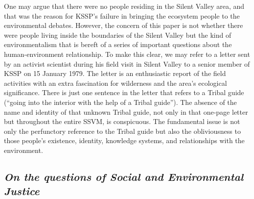 \documentclass[twoside, 13pt]{article}
\begin{document}
{{{{One may argue that there were no people residing in the Silent Valley area, and that was the reason for KSSP’s failure in bringing the ecosystem people to the environmental debates. However, the concern of this paper is not whether there were people living inside the boundaries of the Silent Valley but the kind of environmentalism that is bereft of a series of important questions about the human-environment relationship. To make this clear, we may refer to a letter sent by an activist scientist during his field visit in Silent Valley to a senior member of KSSP on 15 January 1979. The letter is an enthusiastic report of the field activities with an extra fascination for wilderness and the area’s ecological significance. There is just one sentence in the letter that refers to a Tribal guide (“going into the interior with the help of a Tribal guide”). The absence of the name and identity of that unknown Tribal guide, not only in that one-page letter but throughout the entire SSVM, is conspicuous. The fundamental issue is not only the perfunctory reference to the Tribal guide but also the obliviousness to those people’s existence, identity, knowledge systems, and relationships with the environment.} 

\vspace{-.2cm}

{\fontsize{8}{10}\selectfont\subsection*{\textit{ On the questions of Social and Environmental Justice}}

}}}}
\end{document}
